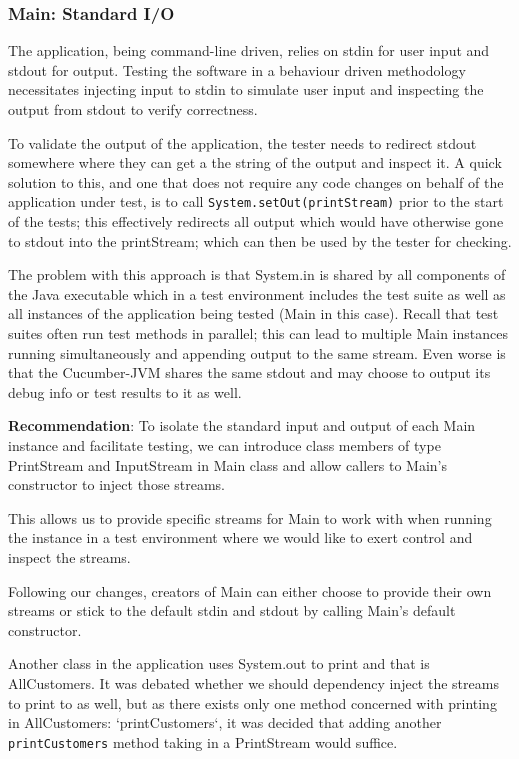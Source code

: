 \subsubsection{Main: Standard I/O}
\label{sec:main-stdio}
The application, being command-line driven, relies on stdin for user input and stdout for output. Testing the software in a behaviour driven methodology necessitates injecting input to stdin to simulate user input and inspecting the output from stdout to verify correctness. 
\par
To validate the output of the application, the tester needs to redirect stdout somewhere where they can get a the string of the output and inspect it. A quick solution to this, and one that does not require any code changes on behalf of the application under test, is to call \lstinline{System.setOut(printStream)} prior to the start of the tests; this effectively redirects all output which would have otherwise gone to stdout into the printStream; which can then be used by the tester for checking. 
\par
The problem with this approach is that System.in is shared by all components of the Java executable which in a test environment includes the test suite as well as all instances of the application being tested (Main in this case). Recall that test suites often run test methods in parallel; this can lead to multiple Main instances running simultaneously and appending output to the same stream. Even worse is that the Cucumber-JVM shares the same stdout and may choose to output its debug info or test results to it as well. 
\par 
\textbf{Recommendation}: To isolate the standard input and output of each Main instance and facilitate testing, we can introduce class members of type PrintStream and InputStream in Main class and allow callers to Main's constructor to inject those streams.
\par
This allows us to provide specific streams for Main to work with when running the instance in a test environment where we would like to exert control and inspect the streams. 
\par 
Following our changes, creators of Main can either choose to provide their own streams or stick to the default stdin and stdout by calling Main's default constructor. 
\par
Another class in the application uses System.out to print and that is AllCustomers. It was debated whether we should dependency inject the streams to print to as well, but as there exists only one method concerned with printing in AllCustomers: `printCustomers`, it was decided that adding another \lstinline{printCustomers} method taking in a PrintStream would suffice.
